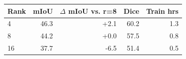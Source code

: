 \begin{tabular}{lrrrr}
\toprule
Rank & mIoU & $\Delta$ mIoU vs. r=8 & Dice & Train hrs \\
\midrule
4 & 46.3 & +2.1 & 60.2 & 1.3 \\
8 & 44.2 & +0.0 & 57.5 & 0.8 \\
16 & 37.7 & -6.5 & 51.4 & 0.5 \\
\bottomrule
\end{tabular}

